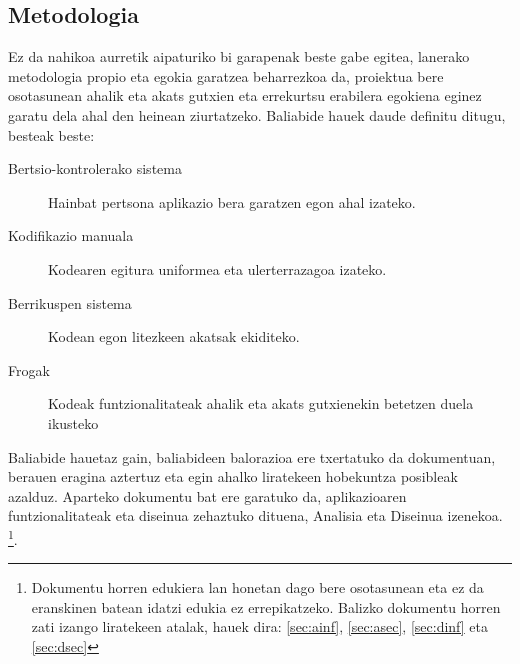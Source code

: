 \subsection{Metodologia}
\label{sec:amet}
Ez da nahikoa aurretik aipaturiko bi garapenak beste gabe egitea, lanerako metodologia propio eta egokia garatzea beharrezkoa da, proiektua bere osotasunean ahalik eta akats gutxien eta errekurtsu erabilera egokiena eginez garatu dela ahal den heinean ziurtatzeko. Baliabide hauek daude definitu ditugu, besteak beste:

\begin{description}
 \item [Bertsio-kontrolerako sistema] Hainbat pertsona aplikazio bera garatzen egon ahal izateko.
 \item [Kodifikazio manuala] Kodearen egitura uniformea eta ulerterrazagoa izateko.
 \item [Berrikuspen sistema] Kodean egon litezkeen akatsak ekiditeko.
 \item [Frogak] Kodeak funtzionalitateak ahalik eta akats gutxienekin betetzen duela ikusteko
\end{description}

Baliabide hauetaz gain, baliabideen balorazioa ere txertatuko da dokumentuan, berauen eragina aztertuz eta egin ahalko liratekeen hobekuntza posibleak azalduz. Aparteko dokumentu bat ere garatuko da, aplikazioaren funtzionalitateak eta diseinua zehaztuko dituena, Analisia eta Diseinua izenekoa. \footnote{Dokumentu horren edukiera lan honetan dago bere osotasunean eta ez da eranskinen batean idatzi edukia ez errepikatzeko. Balizko dokumentu horren zati izango liratekeen atalak, hauek dira: \ref{sec:ainf}, \ref{sec:asec}, \ref{sec:dinf} eta \ref{sec:dsec}}. 